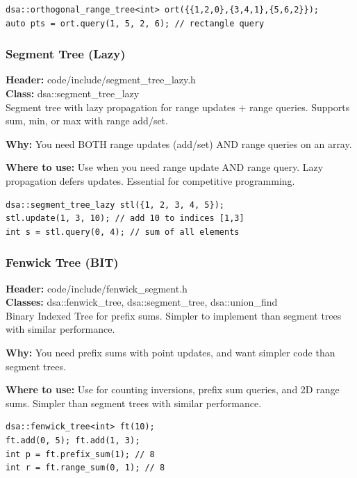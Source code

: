 \documentclass[11pt]{article}
\begin{document}
\begin{lstlisting}
dsa::orthogonal_range_tree<int> ort({{1,2,0},{3,4,1},{5,6,2}});
auto pts = ort.query(1, 5, 2, 6); // rectangle query
\end{lstlisting}

\subsubsection{Segment Tree (Lazy)}
\textbf{Header:} code/include/segment\_tree\_lazy.h\\
\textbf{Class:} dsa::segment\_tree\_lazy\\

Segment tree with lazy propagation for range updates + range queries. Supports sum, min, or max with range add/set.

\textbf{Why:} You need BOTH range updates (add/set) AND range queries on an array. \par \textbf{Where to use:} Use when you need range update AND range query. Lazy propagation defers updates. Essential for competitive programming.

\begin{lstlisting}
dsa::segment_tree_lazy stl({1, 2, 3, 4, 5});
stl.update(1, 3, 10); // add 10 to indices [1,3]
int s = stl.query(0, 4); // sum of all elements
\end{lstlisting}

\subsubsection{Fenwick Tree (BIT)}
\textbf{Header:} code/include/fenwick\_segment.h\\
\textbf{Classes:} dsa::fenwick\_tree, dsa::segment\_tree, dsa::union\_find\\

Binary Indexed Tree for prefix sums. Simpler to implement than segment trees with similar performance.

\textbf{Why:} You need prefix sums with point updates, and want simpler code than segment trees. \par \textbf{Where to use:} Use for counting inversions, prefix sum queries, and 2D range sums. Simpler than segment trees with similar performance.

\begin{lstlisting}
dsa::fenwick_tree<int> ft(10);
ft.add(0, 5); ft.add(1, 3);
int p = ft.prefix_sum(1); // 8
int r = ft.range_sum(0, 1); // 8
\end{lstlisting}
\end{document}
